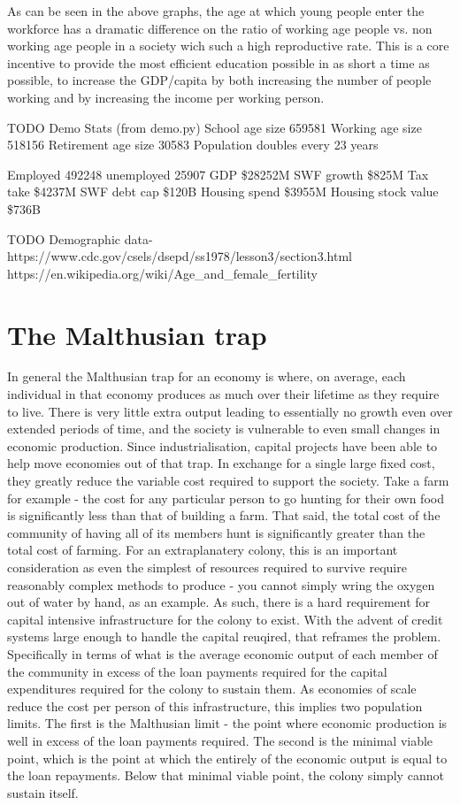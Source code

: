 \documentclass[10pt]{article}
\begin{document}
As can be seen in the above graphs, the age at which young people enter the workforce has a dramatic difference on the ratio of working age people vs. non working age people in a society wich such a high reproductive rate. This is a core incentive to provide the most efficient education possible in as short a time as possible, to increase the GDP/capita by both increasing the number of people working and by increasing the income per working person.


TODO Demo Stats (from demo.py)
School age size 659581
Working age size 518156
Retirement age size 30583
Population doubles every 23 years

Employed 492248 unemployed 25907
GDP \$28252M
SWF growth \$825M
Tax take \$4237M
SWF debt cap \$120B
Housing spend \$3955M
Housing stock value \$736B

TODO Demographic data-
https://www.cdc.gov/csels/dsepd/ss1978/lesson3/section3.html
https://en.wikipedia.org/wiki/Age_and_female_fertility




\section{The Malthusian trap}
In general the Malthusian trap for an economy is where, on average, each individual in that economy produces as much over their lifetime as they require to live. There is very little extra output leading to essentially no growth even over extended periods of time, and the society is vulnerable to even small changes in economic production. Since industrialisation, capital projects have been able to help move economies out of that trap. In exchange for a single large fixed cost, they greatly reduce the variable cost required to support the society. Take a farm for example - the cost for any particular person to go hunting for their own food is significantly less than that of building a farm. That said, the total cost of the community of having all of its members hunt is significantly greater than the total cost of farming. For an extraplanatery colony, this is an important consideration as even the simplest of resources required to survive require reasonably complex methods to produce - you cannot simply wring the oxygen out of water by hand, as an example. As such, there is a hard requirement for capital intensive infrastructure for the colony to exist. With the advent of credit systems large enough to handle the capital reuqired, that reframes the problem. Specifically in terms of what is the average economic output of each member of the community in excess of the loan payments required for the capital expenditures required for the colony to sustain them. As economies of scale reduce the cost per person of this infrastructure, this implies two population limits. The first is the Malthusian limit - the point where economic production is well in excess of the loan payments required. The second is the minimal viable point, which is the point at which the entirely of the economic output is equal to the loan repayments. Below that minimal viable point, the colony simply cannot sustain itself.
\end{document}
